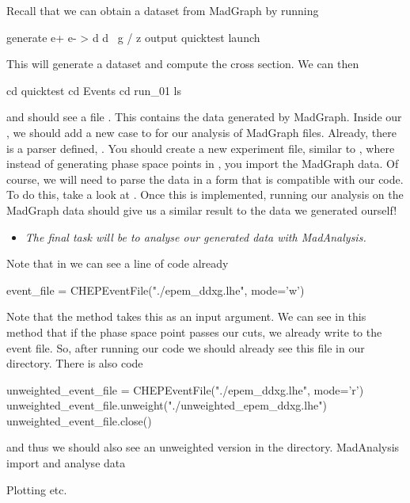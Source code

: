 Recall that we can obtain a dataset from MadGraph by running
\begin{codeenv}
    generate e+ e- > d d~ g / z
    output quicktest
    launch
\end{codeenv}
This will generate a dataset and compute the cross section. We can then
\begin{codeenv}
    cd quicktest
    cd Events
    cd run_01
    ls
\end{codeenv}
and should see a file . This contains the data generated by MadGraph. Inside our , we should add a new case to  for our analysis of MadGraph files. Already, there is a parser defined, . You should create a new experiment file, similar to , where instead of generating phase space points in , you import the MadGraph data. Of course, we will need to parse the data in a form that is compatible with our code. To do this, take a look at . Once this is implemented, running our analysis on the MadGraph data should give us a similar result to the data we generated ourself!

\begin{itemize}
    \item \textit{The final task will be to analyse our generated data with MadAnalysis.}
\end{itemize}
Note that in  we can see a line of code already
\begin{codeenv}
        event_file = CHEPEventFile("./epem_ddxg.lhe", mode='w')
\end{codeenv}
Note that the  method takes this as an input argument. We can see in this method that if the phase space point passes our cuts, we already write to the event file. So, after running our code we should already see this file in our directory. There is also code
\begin{codeenv}
        unweighted_event_file = CHEPEventFile("./epem_ddxg.lhe", mode='r')
    unweighted_event_file.unweight("./unweighted_epem_ddxg.lhe")
    unweighted_event_file.close()
\end{codeenv}
and thus we should also see an unweighted version in the directory.
\color{red}MadAnalysis import and analyse data\color{black}

Plotting etc.